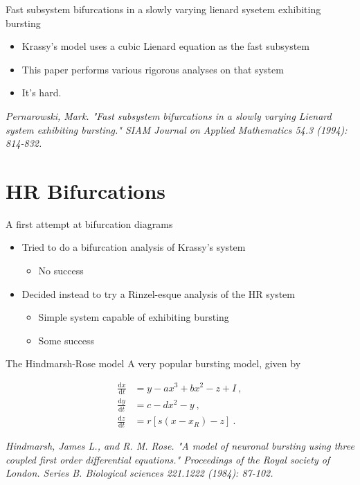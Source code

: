 \documentclass{beamer}
\begin{document}
\begin{frame}[label={sec:orgffa7ec5}]{Fast subsystem bifurcations in a slowly varying lienard sysetem exhibiting bursting}
\begin{itemize}
\item Krassy's model uses a cubic Lienard equation as the fast subsystem
\item This paper performs various rigorous analyses on that system
\item It's hard.
\end{itemize}

\vfill

\emph{Pernarowski, Mark. "Fast subsystem bifurcations in a slowly varying Lienard system exhibiting bursting." SIAM Journal on Applied Mathematics 54.3 (1994): 814-832.}
\end{frame}

\section{HR Bifurcations}
\label{sec:orgfa5e9c5}
\begin{frame}[label={sec:orga92517c}]{A first attempt at bifurcation diagrams}
\begin{itemize}
\item Tried to do a bifurcation analysis of Krassy's system
\begin{itemize}
\item No success
\end{itemize}
\item Decided instead to try a Rinzel-esque analysis of the HR system
\begin{itemize}
\item Simple system capable of exhibiting bursting
\item Some success
\end{itemize}
\end{itemize}
\end{frame}

\begin{frame}[label={sec:org1cb2498}]{The Hindmarsh-Rose model}
A very popular bursting model, given by

\begin{align}
\frac{\mathrm d x}{\mathrm d t} &= y - ax^3 +bx^2-z+I~,\\
\frac{\mathrm d y}{\mathrm d t} &= c - dx^2 -y~,\\
\frac{\mathrm d z}{\mathrm d t} &= r\left[s(x-x_R)-z\right]~.
\end{align}

\vfill
\emph{Hindmarsh, James L., and R. M. Rose. "A model of neuronal bursting using three coupled first order differential equations." Proceedings of the Royal society of London. Series B. Biological sciences 221.1222 (1984): 87-102.}
\end{frame}
\end{document}
